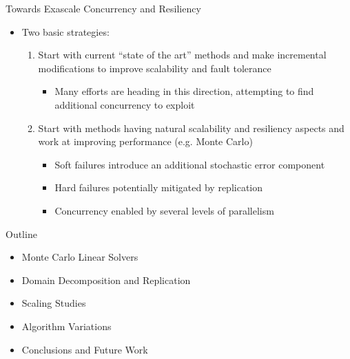 \documentclass{beamer}
\begin{document}
\begin{frame}{Towards Exascale Concurrency and Resiliency}
  \begin{itemize}
    \item Two basic strategies:
      \vfill
      \begin{enumerate}
        \item Start with current ``state of the art'' methods and make
          incremental modifications to improve scalability and fault
          tolerance
          \begin{itemize}
            \item Many efforts are heading in this direction, attempting
              to find additional concurrency to exploit
          \end{itemize}
        \vfill
        \item Start with methods having natural scalability and resiliency
          aspects and work at improving performance (e.g. Monte Carlo)
          \begin{itemize}
            \item Soft failures introduce an additional stochastic error
              component
            \item Hard failures potentially mitigated by replication
            \item Concurrency enabled by several levels of parallelism
          \end{itemize}
      \end{enumerate}
  \end{itemize}
  \vfill
\end{frame}

\begin{frame}{Outline}

  \begin{itemize}
  \item Monte Carlo Linear Solvers
    \vfill
  \item Domain Decomposition and Replication
    \vfill
  \item Scaling Studies
    \vfill
  \item Algorithm Variations
    \vfill
  \item Conclusions and Future Work
  \end{itemize}
  
\end{frame}
\end{document}

